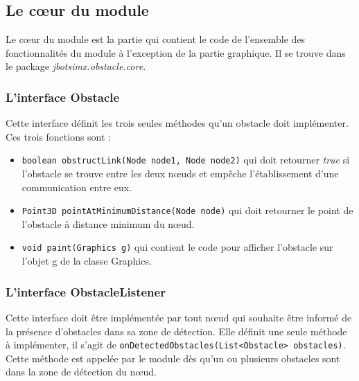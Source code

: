 \documentclass{article}
\newcommand{\obstacle}{{\tt Obstacle}\xspace}
\begin{document}


\subsection{Le c\oe ur du module}

Le c\oe ur du module est la partie qui contient le code de l'ensemble des fonctionnalités du module à l'exception de la partie graphique. Il se trouve dans le package \emph{jbotsimx.obstacle.core}.

\subsubsection{L'interface Obstacle}

Cette interface définit les trois seules méthodes qu'un obstacle doit implémenter. Ces trois fonctions sont : 


\begin{itemize}

\item \texttt{boolean obstructLink(Node node1, Node node2)} qui doit retourner \emph{true} si l'obstacle se trouve entre les deux n\oe uds et empêche l'établissement d'une communication entre eux.\medskip

\item \texttt{Point3D pointAtMinimumDistance(Node node)} qui doit retourner le point de l'obstacle à distance minimum du n\oe ud.\medskip

\item \texttt{void paint(Graphics g)} qui contient le code pour afficher l'obstacle sur l'objet g de la classe Graphics.
\end{itemize}


\subsubsection{L'interface ObstacleListener}
Cette interface doit être implémentée par tout n\oe ud qui souhaite être informé de la présence d'obstacles dans sa zone de détection. Elle définit une seule méthode à implémenter, il s'agit de \texttt{onDetectedObstacles(List<Obstacle> obstacles)}. Cette méthode est appelée par le module dès qu'un ou plusieurs obstacles sont dans la zone de détection du n\oe ud.
\end{document}
